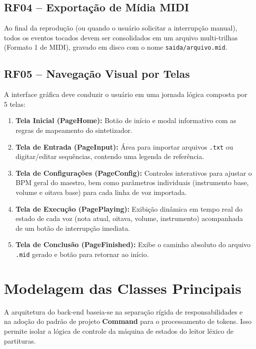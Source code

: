 \documentclass[12pt, a4paper]{article}
\begin{document}
\subsection{RF04 -- Exportação de Mídia MIDI}
Ao final da reprodução (ou quando o usuário solicitar a interrupção manual), todos os eventos tocados devem ser consolidados em um arquivo multi-trilhas (Formato 1 de MIDI), gravado em disco com o nome \texttt{saida/arquivo.mid}.

\subsection{RF05 -- Navegação Visual por Telas}
A interface gráfica deve conduzir o usuário em uma jornada lógica composta por 5 telas:
\begin{enumerate}
  \item \textbf{Tela Inicial (PageHome):} Botão de início e modal informativo com as regras de mapeamento do sintetizador.
  \item \textbf{Tela de Entrada (PageInput):} Área para importar arquivos \texttt{.txt} ou digitar/editar sequências, contendo uma legenda de referência.
  \item \textbf{Tela de Configurações (PageConfig):} Controles interativos para ajustar o BPM geral do maestro, bem como parâmetros individuais (instrumento base, volume e oitava base) para cada linha de voz importada.
  \item \textbf{Tela de Execução (PagePlaying):} Exibição dinâmica em tempo real do estado de cada voz (nota atual, oitava, volume, instrumento) acompanhada de um botão de interrupção imediata.
  \item \textbf{Tela de Conclusão (PageFinished):} Exibe o caminho absoluto do arquivo \texttt{.mid} gerado e botão para retornar ao início.
\end{enumerate}

\section{Modelagem das Classes Principais}

A arquitetura do back-end baseia-se na separação rígida de responsabilidades e na adoção do padrão de projeto \textbf{Command} para o processamento de tokens. Isso permite isolar a lógica de controle da máquina de estados do leitor léxico de partituras.
\end{document}
